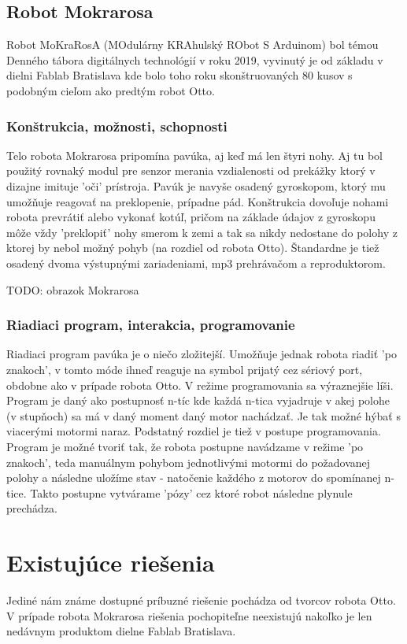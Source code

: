 \subsection{Robot Mokrarosa}
Robot MoKraRosA (MOdulárny KRAhulský RObot S Arduinom) bol témou Denného tábora digitálnych technológií v roku 2019, vyvinutý je od základu v dielni Fablab Bratislava kde bolo toho roku skonštruovaných 80 kusov s podobným cieľom ako predtým robot Otto.

\subsubsection{Konštrukcia, možnosti, schopnosti}
Telo robota Mokrarosa pripomína pavúka, aj keď má len štyri nohy. Aj tu bol použitý rovnaký modul pre senzor merania vzdialenosti od prekážky ktorý v dizajne imituje 'oči' prístroja. Pavúk je navyše osadený gyroskopom, ktorý mu umožňuje reagovať na preklopenie, prípadne pád. Konštrukcia dovoľuje nohami robota prevrátiť alebo vykonať kotúľ, pričom na základe údajov z gyroskopu môže vždy 'preklopiť' nohy smerom k zemi a tak sa nikdy nedostane do polohy z ktorej by nebol možný pohyb (na rozdiel od robota Otto). Štandardne je tiež osadený dvoma výstupnými zariadeniami, mp3 prehrávačom a reproduktorom.

TODO: obrazok Mokrarosa

\subsubsection{Riadiaci program, interakcia, programovanie}
Riadiaci program pavúka je o niečo zložitejší. Umožňuje jednak robota riadiť 'po znakoch', v tomto móde ihneď reaguje na symbol prijatý cez sériový port, obdobne ako v prípade robota Otto. V režime programovania sa výraznejšie líši. Program je daný ako postupnosť n-tíc kde každá n-tica vyjadruje v akej polohe (v stupňoch) sa má v daný moment daný motor nachádzať. Je tak možné hýbať s viacerými motormi naraz. Podstatný rozdiel je tiež v postupe programovania. Program je možné tvoriť tak, že robota postupne navádzame v režime 'po znakoch', teda manuálnym pohybom jednotlivými motormi do požadovanej polohy a následne uložíme stav - natočenie každého z motorov do spomínanej n-tice. Takto postupne vytvárame 'pózy' cez ktoré robot následne plynule prechádza.


\section{Existujúce riešenia}
Jediné nám známe dostupné príbuzné riešenie pochádza od tvorcov robota Otto. V prípade robota Mokrarosa riešenia pochopiteľne neexistujú nakoľko je len nedávnym produktom dielne Fablab Bratislava.

